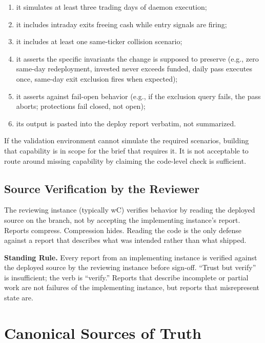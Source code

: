 \documentclass[11pt, a4paper]{article}
\newcommand{\rulebox}[1]{%
  \begin{framed}\noindent\textbf{Standing Rule.} #1\end{framed}}
\theoremstyle{definition}
\begin{document}
\begin{enumerate}[leftmargin=1.2cm]
\item it simulates at least three trading days of daemon execution;
\item it includes intraday exits freeing cash while entry signals are firing;
\item it includes at least one same-ticker collision scenario;
\item it asserts the specific invariants the change is supposed to preserve
(e.g., zero same-day redeployment, invested never exceeds funded, daily
pass executes once, same-day exit exclusion fires when expected);
\item it asserts against fail-open behavior (e.g., if the exclusion query
fails, the pass aborts; protections fail closed, not open);
\item its output is pasted into the deploy report verbatim, not summarized.
\end{enumerate}

If the validation environment cannot simulate the required scenarios,
building that capability is in scope for the brief that requires it. It is
not acceptable to route around missing capability by claiming the
code-level check is sufficient.

\subsection{Source Verification by the Reviewer}

The reviewing instance (typically wC) verifies behavior by reading the
deployed source on the branch, not by accepting the implementing instance's
report. Reports compress. Compression hides. Reading the code is the only
defense against a report that describes what was intended rather than what
shipped.

\rulebox{Every report from an implementing instance is verified against
the deployed source by the reviewing instance before sign-off. ``Trust but
verify'' is insufficient; the verb is ``verify.'' Reports that describe
incomplete or partial work are not failures of the implementing instance,
but reports that misrepresent state are.}

\section{Canonical Sources of Truth}
\end{document}
